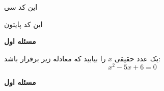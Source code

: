 \documentclass[a4paper,12pt]{article}
\begin{document}



این کد سی
\lr{}

این کد پایتون
\lr{}

\begin{mybox}

\textbf{مسئله اول}

یک عدد حقیقی $x$ را بیابید که معادله زیر برقرار باشد:
$$x^2 - 5x + 6 = 0$$
\end{mybox}

\textbf{مسئله اول}

\newpage
\end{document}
